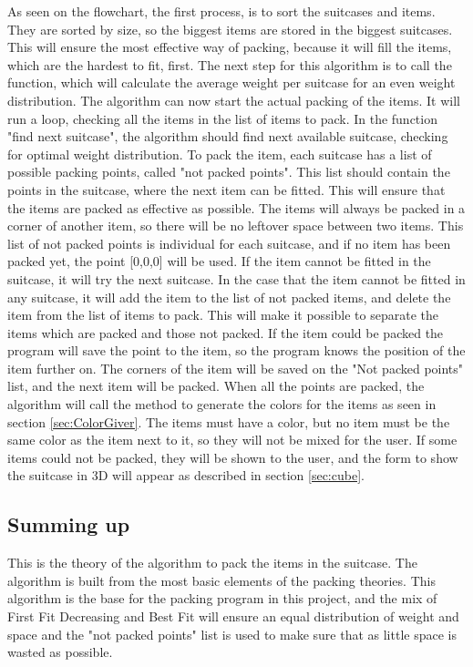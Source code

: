 As seen on the flowchart, the first process, is to sort the suitcases and items. They are sorted by size, so the biggest items are stored in the biggest suitcases. This will ensure the most effective way of packing, because it will fill the items, which are the hardest to fit, first. The next step for this algorithm is to call the function, which will calculate the average weight per suitcase for an even weight distribution. The algorithm can now start the actual packing of the items.
It will run a loop, checking all the items in the list of items to pack. In the function "find next suitcase", the algorithm should find next available suitcase, checking for optimal weight distribution. To pack the item, each suitcase has a list of possible packing points, called "not packed points". This list should contain the points in the suitcase, where the next item can be fitted. This will ensure that the items are packed as effective as possible. The items will always be packed in a corner of another item, so there will be no leftover space between two items. This list of not packed points is individual for each suitcase, and if no item has been packed yet, the point [0,0,0] will be used. If the item cannot be fitted in the suitcase, it will try the next suitcase. In the case that the item cannot be fitted in any suitcase, it will add the item to the list of not packed items, and delete the item from the list of items to pack. This will make it possible to separate the items which are packed and those not packed. If the item could be packed the program will save the point to the item, so the program knows the position of the item further on. The corners of the item will be saved on the "Not packed points" list, and the next item will be packed.
When all the points are packed, the algorithm will call the method to generate the colors for the items as seen in section \ref{sec:ColorGiver}. The items must have a color, but no item must be the same color as the item next to it, so they will not be mixed for the user. If some items could not be packed, they will be shown to the user, and the form to show the suitcase in 3D will appear as described in section \ref{sec:cube}.

\subsection{Summing up}
This is the theory of the algorithm to pack the items in the suitcase. The algorithm is built from the most basic elements of the packing theories. This algorithm is the base for the packing program in this project, and the mix of First Fit Decreasing and Best Fit will ensure an equal distribution of weight and space and the "not packed points" list is used to make sure that as little space is wasted as possible.